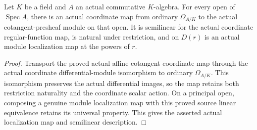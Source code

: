 \begin{lemma}
\label{sc0-canonical-port:ext:affine-ordinary-differential-coordinate-map}
\leanok
Let \(K\) be a field and \(A\) an actual commutative
\(K\)-algebra. For every open of \(\operatorname{Spec}A\),
there is an actual coordinate map from ordinary
\(\Omega_{A/K}\) to the actual cotangent-presheaf
module on that open. It is semilinear for the actual
coordinate regular-function map, is natural under
restriction, and on \(D(r)\) is an actual module
localization map at the powers of \(r\).
\end{lemma}
\begin{proof}
Transport the proved actual affine cotangent coordinate
map through the actual coordinate differential-module
isomorphism to ordinary \(\Omega_{A/K}\).
This isomorphism preserves the actual differential
images, so the map retains both restriction naturality
and the coordinate scalar action. On a principal
open, composing a genuine module localization map
with this proved source linear equivalence retains
its universal property. This gives the asserted
actual localization map and semilinear description.
\end{proof}

